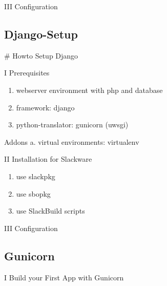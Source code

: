 \documentclass[letterpaper,10pt,english]{sphinxmanual}
\begin{document}
III Configuration


\subsection{Django-Setup}
\label{sdocs/django/django-setup/django-setup:django-setup}\label{sdocs/django/django-setup/django-setup::doc}
\# Howto Setup Django

I Prerequisites
\begin{enumerate}
\item {} 
webserver environment with php and database

\item {} 
framework: django

\item {} 
python-translator: gunicorn (uwsgi)

\end{enumerate}

Addons
a. virtual environments: virtualenv

II Installation for Slackware
\begin{enumerate}
\item {} 
use slackpkg

\item {} 
use sbopkg

\item {} 
use SlackBuild scripts

\end{enumerate}

III Configuration


\subsection{Gunicorn}
\label{sdocs/django/gunicorn/gunicorn::doc}\label{sdocs/django/gunicorn/gunicorn:gunicorn}
I Build your First App with Gunicorn
\end{document}
